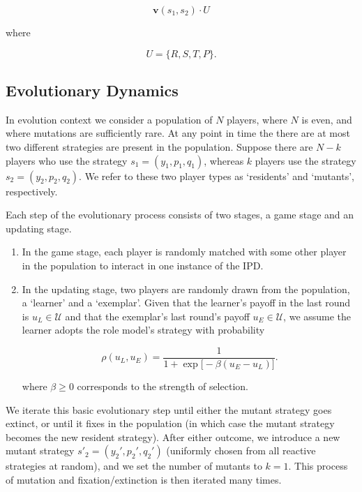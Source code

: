 \documentclass[11pt]{article}
\theoremstyle{plainCl1}
\theoremstyle{plainCl2}
\begin{document}
\begin{equation}
    \mathbf{v}(s_1, s_2) \cdot U
\end{equation}

where

\begin{equation}
    U = \{R, S, T, P\}.
\end{equation}

\subsection{Evolutionary Dynamics}

In evolution context we consider a population of \(N\) players,
where \(N\) is even, and where mutations are sufficiently rare. At any point
in time the there are at most two different strategies are present in
the population. Suppose there are \(N - k\) players who use the strategy \(s_{1}=(y_{1},
p_{1}, q_{1})\), whereas \(k\) players use the strategy \(s_{2}=(y_{2}, p_{2},
q_{2})\). We refer to these two player types as ‘residents’ and ‘mutants’,
respectively.

Each step of the evolutionary process consists of two stages, a game stage and
an updating stage.

\begin{enumerate}
    \item In the game stage, each player is randomly matched with some
    other player in the population to interact in one instance of the IPD.
    \item In the updating stage, two players are randomly drawn from
    the population, a `learner' and a `exemplar'. Given that the learner's payoff
    in the last round is $u_L\!\in\! \mathcal{U}$ and that the exemplar's last
    round's payoff $u_E\!\in\! \mathcal{U}$, we assume the learner adopts the role
    model's strategy with probability 

    \begin{equation} \label{Eq:rho}
    \rho(u_L, u_E) = \frac{1}{1\!+\!\exp\big[ \!-\!\beta (u_E\!-\!u_L) \big]}. 
    \end{equation}

    where $\beta\!\ge\!0$ corresponds to the strength of selection.
\end{enumerate}

We iterate this basic evolutionary step until either the mutant strategy goes
extinct, or until it fixes in the population (in which case the mutant strategy
becomes the new resident strategy). After either outcome, we introduce a new
mutant strategy $s'_2\!=\!(y_2',p_2',q_2')$ (uniformly chosen from all reactive
strategies at random), and we set the number of mutants to $k\!=\!1$. This
process of mutation and fixation/extinction is then iterated many times.
\end{document}
